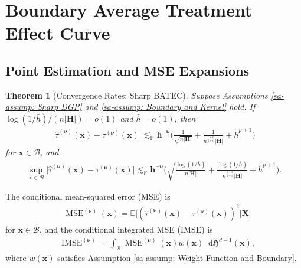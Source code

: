 \documentclass[10pt]{article}
\newtheorem{thm}{Theorem}
\newcommand{\E}{\mathbb{E}}
\newcommand{\Haus}{\mathfrak{H}}
\newcommand{\dif}{\mathop{}\!\mathrm{d}}
\newcommand{\lessp}{\lesssim_{\mathbb{P}}}
\newcommand{\bh}{\mathbf{h}}
\newcommand{\bH}{\mathbf{H}}
\newcommand{\bx}{\mathbf{x}}
\newcommand{\bX}{\mathbf{X}}
\newcommand{\bnu}{\boldsymbol{\nu}}
\newcommand{\B}{\mathcal{B}}
\begin{document}
\section{Boundary Average Treatment Effect Curve}

\subsection{Point Estimation and MSE Expansions}

\begin{thm}[Convergence Rates: Sharp BATEC]\label{sa-thm: Convergence Rates: Sharp BATEC}
    Suppose Assumptions \ref{sa-assump: Sharp DGP} and \ref{sa-assump: Boundary and Kernel} hold. If $\log(1/\bar{h})/(n |\bH|) = o(1)$ and $\bar{h} = o(1)$, then
    \begin{align*}
        \big|\widehat{\tau}^{(\bnu)}(\bx) - \tau^{(\bnu)}(\bx) \big|
        \lessp \bh^{-\bnu} \Big(\frac{1}{\sqrt{n |\bH|}} + \frac{1}{n^{\frac{1+v}{2+v}}|\bH|} + \bar{h}^{p+1}\Big)
    \end{align*}
    for $\bx \in \B$, and
    \begin{align*}
        \sup_{\bx \in \B} \big|\widehat{\tau}^{(\bnu)}(\bx) - \tau^{(\bnu)}(\bx)\big|
        \lessp \bh^{-\bnu} \Big(\sqrt{\frac{\log(1/\bar{h})}{ n |\bH|}} + \frac{\log(1/\bar{h})}{n^{\frac{1+v}{2+v}}|\bH|} + \bar{h}^{p+1}\Big).
    \end{align*}
\end{thm}

The conditional mean-squared error (MSE) is
\begin{align*}
    & \operatorname{MSE}^{(\bnu)}(\bx) = \E \big[(\widehat{\tau}^{(\bnu)}(\bx) - \tau^{(\bnu)}(\bx))^2 \big| \bX \big]
\end{align*}
for $\bx\in \B$, and the conditional integrated MSE (IMSE) is
\begin{align*}
    & \operatorname{IMSE}^{(\bnu)} = \int_{\B}  \operatorname{MSE}^{(\bnu)}(\bx) w(\bx) \dif\Haus^{d-1}(\bx),
\end{align*}
where $w(\bx)$ satisfies Assumption \ref{sa-assump: Weight Function and Boundary}.
\end{document}
